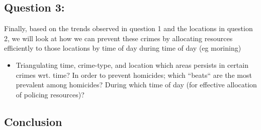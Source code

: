 \documentclass[a4paper]{article}
\begin{document}
\subsection{Question 3:}


Finally, based on the trends observed in question 1 and the locations in question 2, we will look at how we can prevent these crimes by allocating resources efficiently to those locations by time of day during time of day (eg morining)


\begin{itemize}
  \item Triangulating time, crime-type, and location which areas persists in certain crimes wrt. time?
In order to prevent homicides; which “beats“ are the most prevalent among homicides? During which time of day (for effective allocation of policing resources)? 
\end{itemize}







\subsection{Conclusion}
\end{document}
